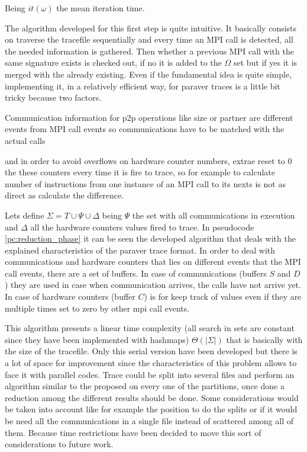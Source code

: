 Being $it(\omega)$ the mean iteration time.

The algorithm developed for this first step is quite intuitive. It basically
consists on traverse the tracefile sequentially and every time an MPI call is
detected, all the needed information is gathered. Then whether a previous MPI call
with the same signature exists is checked out, if no it is added to the
$\Omega$ set but if yes it is merged with the already existing. Even if the
fundamental idea is quite simple, implementing it, in a relatively efficient
way, for paraver traces is a little bit tricky because two factors.
\begin{enumerate*}[label=\roman*)]
  \item Communication information for p2p operations like size or partner are different events from
    MPI call events so communications have to be matched with the actual calls
  \item and in order to avoid overflows on hardware counter numbers, extrae 
    reset to 0 the these counters every time it is fire to trace, so for example to
    calculate number of instructions from one instance of an MPI call to its
    nexts is not as direct as calculate the difference.
\end{enumerate*}

Lets define $\Sigma = T \cup \Psi \cup \Delta$ being $\Psi$ the set with
all communications in execution and $\Delta$ all the hardware counters values
fired to trace. In pseudocode \ref{pc:reduction_phase} it can be seen the
developed algorithm that deals with the explained characteristics of the paraver
trace format. In order to deal with communications and hardware counters that
lies on different events that the MPI call events, there are a set of buffers.
In case of communications (buffers $S$ and $D$) they are used in case when communication arrives, the
calls have not arrive yet. In case of hardware counters (buffer $C$) is for keep
track of values even if they are multiple times set to zero by other mpi call
events.

This algorithm presents a linear time complexity (all search in sets are
constant since they have been implemented with hashmaps) $\Theta(|\Sigma|)$ that is
basically with the size of the tracefile. Only this serial version have been
developed but there is a lot of space for improvement since the characteristics
of this problem allows to face it with parallel codes. Trace could be split into
several files and perform an algorithm similar to the proposed on every one of
the partitions, once done a reduction among the different results should be
done. Some considerations would be taken into account like for example the
position to do the splits or if it would be need all the communications in a
single file instead of scattered among all of them. Because time restrictions
have been decided to move this sort of considerations to future work.

